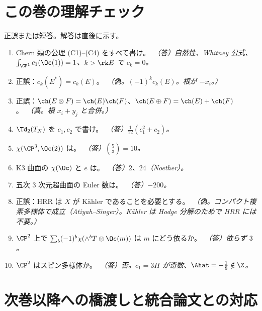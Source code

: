 \section{この巻の理解チェック}\label{sec:check}
正誤または短答。解答は直後に示す。
\begin{enumerate}
\item Chern 類の公理 (C1)--(C4) をすべて書け。\ \emph{（答）自然性、Whitney 公式、$\int_{\CP^1}c_1(\Oc(1))=1$、$k>\rk E$ で $c_k=0$。}
\item 正誤：$c_k(E^*)=c_k(E)$。\ \emph{（偽。$(-1)^kc_k(E)$。根が $-x_i$。）}
\item 正誤：$\ch(E\otimes F)=\ch(E)\ch(F)$、$\ch(E\oplus F)=\ch(E)+\ch(F)$。\ \emph{（真。根 $x_i+y_j$ と合併。）}
\item $\Td_2(T_X)$ を $c_1,c_2$ で書け。\ \emph{（答）$\frac1{12}(c_1^2+c_2)$。}
\item $\chi(\CP^3,\Oc(2))$ は。\ \emph{（答）$\binom{5}3=10$。}
\item K3 曲面の $\chi(\Oc)$ と $e$ は。\ \emph{（答）$2$、$24$（Noether）。}
\item 五次 3 次元超曲面の Euler 数は。\ \emph{（答）$-200$。}
\item 正誤：HRR は $X$ が Kähler であることを必要とする。\ \emph{（偽。コンパクト複素多様体で成立（Atiyah--Singer）。Kähler は Hodge 分解のためで HRR には不要。）}
\item $\CP^2$ 上で $\sum_b(-1)^b\chi(\wedge^bT\otimes\Oc(m))$ は $m$ にどう依るか。\ \emph{（答）依らず $3$。}
\item $\CP^2$ はスピン多様体か。\ \emph{（答）否。$c_1=3H$ が奇数、$\Ahat=-\frac18\notin\Z$。}
\end{enumerate}

\section{次巻以降への橋渡しと統合論文との対応}\label{sec:bridge}
